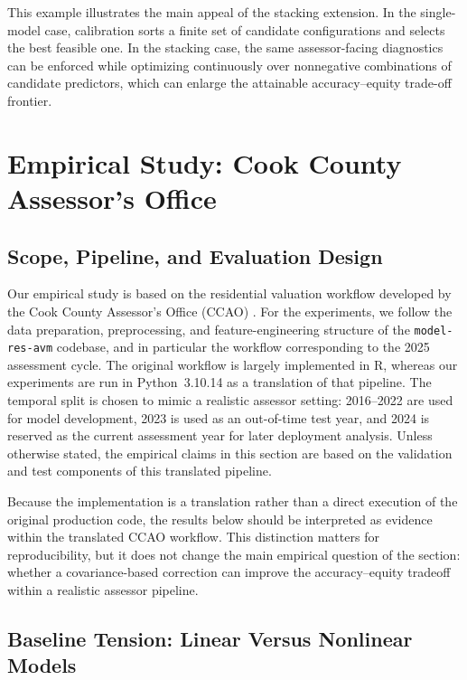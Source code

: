 \documentclass[12pt, draft]{article}
\theoremstyle{plain}
\theoremstyle{definition}
\newcommand{\1}{\mathbf{1}}
\begin{document}
{This example illustrates the main appeal of the stacking extension. In the single-model case, calibration sorts a finite set of candidate configurations and selects the best feasible one. In the stacking case, the same assessor-facing diagnostics can be enforced while optimizing continuously over nonnegative combinations of candidate predictors, which can enlarge the attainable accuracy--equity trade-off frontier.






\section{Empirical Study: Cook County Assessor's Office}
\label{sec:empirical}

\subsection{Scope, Pipeline, and Evaluation Design}

Our empirical study is based on the residential valuation workflow developed by the Cook County Assessor's Office (CCAO) \cite{ccao_data_2026}. For the experiments, we follow the data preparation, preprocessing, and feature-engineering structure of the \texttt{model-res-avm} codebase, and in particular the workflow corresponding to the 2025 assessment cycle. The original workflow is largely implemented in R, whereas our experiments are run in Python~3.10.14 as a translation of that pipeline. The temporal split is chosen to mimic a realistic assessor setting: 2016--2022 are used for model development, 2023 is used as an out-of-time test year, and 2024 is reserved as the current assessment year for later deployment analysis. Unless otherwise stated, the empirical claims in this section are based on the validation and test components of this translated pipeline.

Because the implementation is a translation rather than a direct execution of the original production code, the results below should be interpreted as evidence within the translated CCAO workflow. This distinction matters for reproducibility, but it does not change the main empirical question of the section: whether a covariance-based correction can improve the accuracy--equity tradeoff within a realistic assessor pipeline.

\subsection{Baseline Tension: Linear Versus Nonlinear Models}

}
\end{document}

